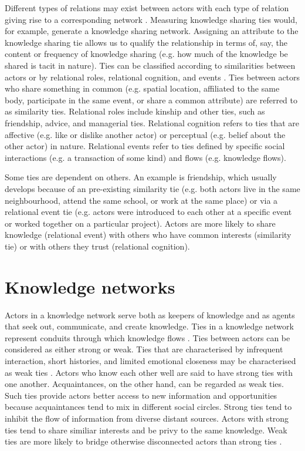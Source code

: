 Different types of relations may exist between actors with each type of relation giving rise to a corresponding network \citep{borgatti2013analyzing}. Measuring knowledge sharing ties would, for example, generate a knowledge sharing network. Assigning an attribute to the knowledge sharing tie allows us to qualify the relationship in terms of, say, the content or frequency of knowledge sharing (e.g. how much of the knowledge be shared is tacit in nature). Ties can be classified according to similarities between actors or by relational roles, relational cognition, and events \citep{borgatti2013analyzing}. Ties between actors who share something in common (e.g. spatial location, affiliated to the same body, participate in the same event, or share a common attribute) are referred to as similarity ties. Relational roles include kinship and other ties, such as friendship, advice, and managerial ties. Relational cognition refers to ties that are affective (e.g. like or dislike another actor) or perceptual (e.g. belief about the other actor) in nature. Relational events refer to ties defined by specific social interactions (e.g. a transaction of some kind) and flows (e.g. knowledge flows).\medskip

Some ties are dependent on others. An example is friendship, which usually develops because of an pre-existing similarity tie (e.g. both actors live in the same neighbourhood, attend the same school, or work at the same place) or via a relational event tie (e.g. actors were introduced to each other at a specific event or worked together on a particular project). Actors are more likely to share knowledge (relational event) with others who have common interests (similarity tie) or with others they trust (relational cognition). \medskip 

\section{Knowledge networks}



Actors in a knowledge network serve both as keepers of knowledge and as agents that seek out, communicate, and create knowledge. Ties in a knowledge network represent conduits through which knowledge flows \citep{phelps2012knowledge}. Ties between actors can be considered as either strong or weak. Ties that are characterised by infrequent interaction, short histories, and limited emotional closeness may be characterised as weak ties \citep{baer2010strength}. Actors who know each other well are said to have strong ties with one another. Acquaintances, on the other hand, can be regarded as weak ties. Such ties provide actors better access to new information and opportunities because acquaintances tend to mix in different social circles. Strong ties tend to inhibit the flow of information from diverse distant sources. Actors with strong ties tend to share similiar interests and be privy to the same knowledge. Weak ties are more likely to bridge otherwise disconnected actors than strong ties \citep{granovetter1973strength,granovetter1983strength}. \medskip


